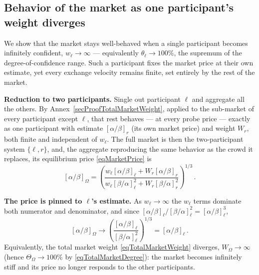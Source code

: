 \documentclass[letterpaper]{article}
\newcommand{\priceAB}{\left[\alpha / \beta\right]}
\newcommand{\priceBA}{\left[\beta / \alpha\right]}
\begin{document}
\subsection{Behavior of the market as one participant's weight diverges}\label{secProofInfiniteWeight}

We show that the market stays well-behaved when a single participant becomes infinitely confident, $w_\ell \to \infty$ --- equivalently $\theta_\ell \to 100\%$, the supremum of the degree-of-confidence range. Such a participant fixes the market price at their own estimate, yet every exchange velocity remains finite, set entirely by the rest of the market.

\textbf{Reduction to two participants.} Single out participant $\ell$ and aggregate all the others. By Annex~\ref{secProofTotalMarketWeight}, applied to the sub-market of every participant except $\ell$, that rest behaves --- at every probe price --- exactly as one participant with estimate $\priceAB_r$ (its own market price) and weight $W_r$, both finite and independent of $w_\ell$. The full market is then the two-participant system $\{\ell, r\}$, and, the aggregate reproducing the same behavior as the crowd it replaces, its equilibrium price \eqref{eqMarketPrice} is
\begin{equation*}
    \priceAB_\Omega = \left( \frac{w_\ell \priceAB_\ell + W_r \priceAB_r}{w_\ell \priceBA_\ell^2 + W_r \priceBA_r^2} \right)^{1/3} \,.
\end{equation*}

\textbf{The price is pinned to $\ell$'s estimate.} As $w_\ell \to \infty$ the $w_\ell$ terms dominate both numerator and denominator, and since $\priceAB_\ell / \priceBA_\ell^2 = \priceAB_\ell^3$,
\begin{equation*}
    \priceAB_\Omega \longrightarrow \left( \frac{\priceAB_\ell}{\priceBA_\ell^2} \right)^{1/3} = \priceAB_\ell \,.
\end{equation*}
Equivalently, the total market weight \eqref{eqTotalMarketWeight} diverges, $W_\Omega \to \infty$ (hence $\Theta_\Omega \to 100\%$ by \eqref{eqTotalMarketDegree}): the market becomes infinitely stiff and its price no longer responds to the other participants.
\end{document}
